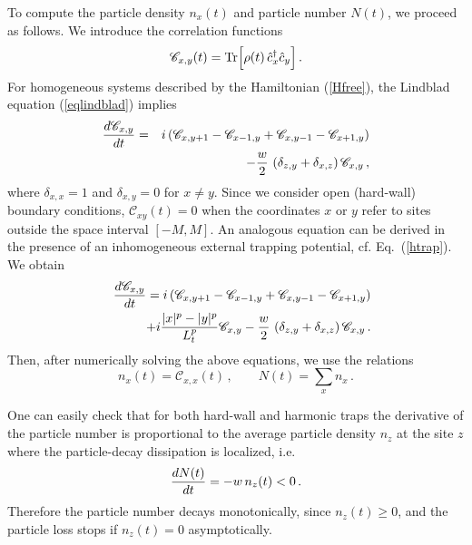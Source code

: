   To compute the particle density $n_x(t)$ and particle number $N(t)$,
  we proceed as follows.  We introduce the correlation functions
  \begin{eqnarray}
    {\mathscr C}_{x,y}(t)= {\rm Tr}\Bigr[ \rho(t) \, \hat c_x^\dagger
      \hat c_y \Bigr] \,.
  \label{defct}
  \end{eqnarray}
  For homogeneous systems described by the Hamiltonian (\ref{Hfree}),
  the Lindblad equation (\ref{eqlindblad}) 
  implies
  \begin{eqnarray}
    {d\mathscr{C}_{x,y}\over dt} &=& i\,( \mathscr{C}_{x,y+1} -
     \mathscr{C}_{x-1,y} + \mathscr{C}_{x,y-1} - \mathscr{C}_{x+1,y} )
        \nonumber\\
      &&- \frac{w}{2} \ ( \delta _{z,y} + 
     \delta _{x, z} ) \, \mathscr{C}_{x,y} \,,
     \label{eqscxy}
  \end{eqnarray}
  where $\delta_{x,x}=1$ and $\delta_{x,y}=0$ for $x\neq y$.  Since we
  consider open (hard-wall) boundary conditions, ${\mathscr
    C}_{xy}(t)=0$ when the coordinates $x$ or $y$ refer to sites outside
  the space interval $[-M,M]$.  An analogous equation can be derived in
  the presence of an inhomogeneous external trapping potential,
  cf. Eq.~(\ref{htrap}).  We obtain
  \begin{eqnarray}
    &&  
    {d\mathscr{C}_{x,y}\over dt} = i\,( \mathscr{C}_{x,y+1} -
     \mathscr{C}_{x-1,y} + \mathscr{C}_{x,y-1} - \mathscr{C}_{x+1,y} )
     \nonumber\\
  &&\;\; + i {|x|^p - |y|^p\over L_t^p} \mathscr{C}_{x,y} 
  - \frac{w}{2} \ ( \delta _{z,y} + 
     \delta _{x, z} ) \, \mathscr{C}_{x,y} \,.
     \label{eqscxytrap}
  \end{eqnarray}
  Then, after numerically solving the above equations, we use the
  relations
  \begin{equation}
  n_x(t)=\mathscr{C}_{x,x}(t) \,,\qquad   N(t) = \sum _x n_x\,.
  \label{ntcxy}
  \end{equation}
  
  One can easily check that for both hard-wall and harmonic traps the
  derivative of the particle number is proportional to the average
  particle density $n_z$ at the site $z$ where the particle-decay
  dissipation is localized, i.e.
  \begin{equation}
    {d N(t)\over dt} = - w \, n_z(t) < 0\,.
  \label{ntnz}
  \end{equation}
  Therefore the particle number decays monotonically, since $n_z(t)\ge
  0$, and the particle loss stops if $n_z(t)= 0$ asymptotically.
  
